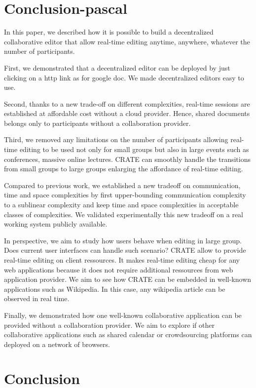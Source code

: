 
\section{Conclusion-pascal}
\label{sec:conclusion}

In this paper, we described how it is possible to build a
decentralized collaborative editor that allow real-time editing
anytime, anywhere, whatever the number of participants. 

First, we demonstrated that a decentralized editor can be deployed by
just clicking on a http link as for google doc. We made decentralized
editors easy to use.

Second, thanks to a new trade-off on different complexities, real-time
sessions are established at affordable cost without a cloud
provider. Hence, shared documents belongs only to participants without
a collaboration provider.

Third, we removed any limitations on the number of participants
allowing real-time editing to be used not only for small groups but
also in large events such as conferences, massive online
lectures. CRATE can smoothly handle the transitions from small groups
to large groups enlarging the affordance of real-time editing.

Compared to previous work, we established a new tradeoff on
communication, time and space complexities by first upper-bounding
communication complexity to a sublinear complexity and keep time and space
complexities in acceptable classes of complexities.  We validated
experimentally this new tradeoff on a real working system publicly
available.

In perspective, we aim to study how users behave when editing in large
group. Does current user interfaces can handle such scenario? 
CRATE allow to provide real-time editing on client ressources. It
makes real-time editing cheap for any web applications because it does
not require additional ressources from web application provider. We
aim to see how CRATE can be embedded in well-known applications such as
Wikipedia. In this case, any wikipedia article can be observed in real
time.

Finally, we demonstrated how one well-known collaborative application
can be provided without a collaboration provider. We aim to explore if
other collaborative applications such as shared calendar or
crowdsourcing platforms can deployed on a network of browsers.



\section{Conclusion}
\label{sec:conclusion}

